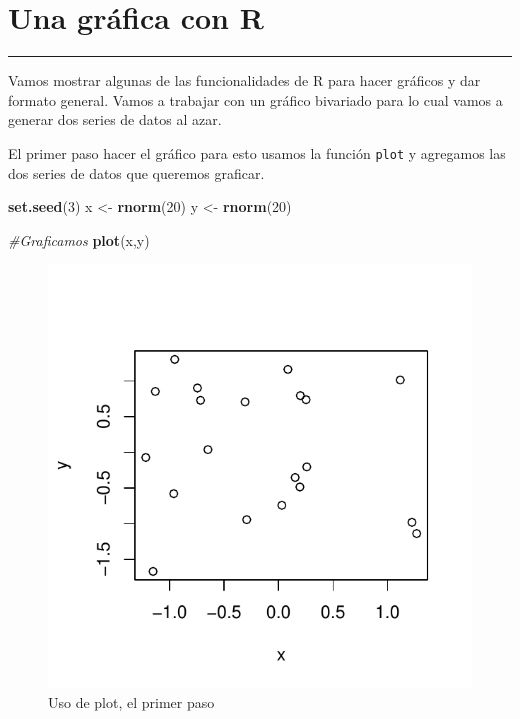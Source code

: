 \documentclass[]{article}
\newenvironment{Shaded}{\begin{snugshade}}{\end{snugshade}}
\newcommand{\KeywordTok}[1]{\textcolor[rgb]{0.13,0.29,0.53}{\textbf{{#1}}}}
\newcommand{\DecValTok}[1]{\textcolor[rgb]{0.00,0.00,0.81}{{#1}}}
\newcommand{\StringTok}[1]{\textcolor[rgb]{0.31,0.60,0.02}{{#1}}}
\newcommand{\CommentTok}[1]{\textcolor[rgb]{0.56,0.35,0.01}{\textit{{#1}}}}
\newcommand{\NormalTok}[1]{{#1}}
\begin{document}
\section{Una gráfica con R}\label{una-grafica-con-r}

\begin{center}\rule{0.5\linewidth}{\linethickness}\end{center}

Vamos mostrar algunas de las funcionalidades de R para hacer gráficos y
dar formato general. Vamos a trabajar con un gráfico bivariado para lo
cual vamos a generar dos series de datos al azar.

El primer paso hacer el gráfico para esto usamos la función
\texttt{plot} y agregamos las dos series de datos que queremos graficar.

\begin{Shaded}
\begin{Highlighting}[]
\KeywordTok{set.seed}\NormalTok{(}\DecValTok{3}\NormalTok{)}
\NormalTok{x <-}\StringTok{ }\KeywordTok{rnorm}\NormalTok{(}\DecValTok{20}\NormalTok{)}
\NormalTok{y <-}\StringTok{ }\KeywordTok{rnorm}\NormalTok{(}\DecValTok{20}\NormalTok{) }

\CommentTok{#Graficamos}
\KeywordTok{plot}\NormalTok{(x,y) }
\end{Highlighting}
\end{Shaded}

\begin{figure}

{\centering \includegraphics{index_files/figure-latex/unnamed-chunk-10-1} 

}

\caption{Uso de plot, el primer paso}\label{fig:unnamed-chunk-10}
\end{figure}
\end{document}
